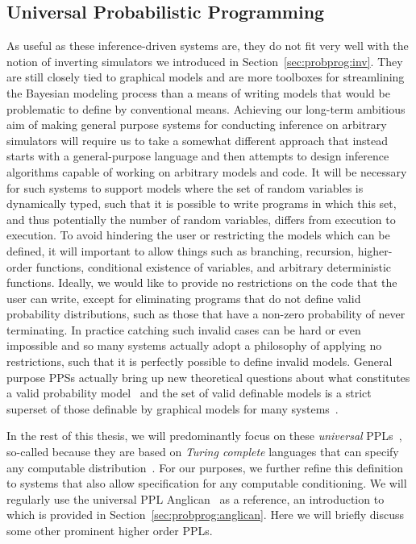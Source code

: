 \subsection{Universal Probabilistic Programming}
\label{sec:probprog:two:general}

As useful as these inference-driven systems are, they do not fit very well with the notion of
inverting simulators we introduced in Section~\ref{sec:probprog:inv}.  They are still closely tied
to graphical models and are more toolboxes for streamlining the Bayesian modeling process than
a means of writing models that would be problematic to define by conventional means.  Achieving
our long-term ambitious aim of making general purpose systems for conducting inference on
arbitrary simulators will require us to take a somewhat different approach that instead starts
with a general-purpose language and then attempts to design inference algorithms capable of
working on arbitrary models and code.  It will be necessary for such systems to
support models where the set of random variables is dynamically typed, such that it is possible 
to write programs in which this set, and thus potentially the number of random variables, differs 
from execution to execution.  To avoid hindering the user or restricting the models which can be
defined, it will important to allow 
things such as branching, recursion, higher-order functions,
conditional existence of variables, and arbitrary
deterministic functions.  Ideally, we would like to provide no restrictions on the code that the user
can write, except for eliminating programs that do not define valid probability distributions, such as
those that have a non-zero probability of never terminating.  In practice catching such invalid cases can
be hard or even impossible and so many systems actually adopt a philosophy of applying no restrictions,
such that it is perfectly possible to define invalid models.  General purpose PPSs actually bring up new
theoretical questions about what constitutes a valid probability model~\citep{heunen2017convenient} and
the set of valid definable models is a strict superset of those definable by graphical models 
for many systems~\citep{goodman2013principles}.

In the rest of this thesis, we will predominantly focus on these \emph{universal} PPLs~\citep{goodman_uai_2008,staton2016semantics}, 
so-called because they are based on \emph{Turing complete} languages that can specify any
computable distribution~\citep{goodman2013principles}.  For our purposes, we further refine this definition
to systems that also allow specification for any computable conditioning.
We will regularly use the universal PPL Anglican~\citep{wood2014new} as a reference, an introduction
to which is provided in Section~\ref{sec:probprog:anglican}. Here we will briefly discuss some other
prominent higher order PPLs.

